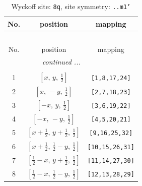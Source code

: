 \documentclass[fleqn,8pt]{jsarticle}
\begin{document}
\begin{longtable}{ccc}
\caption{Wyckoff site: {\tt 8q}, site symmetry: {\tt ..m1'}}
 \\
 \hline \hline
No. & position & mapping \\ \hline \endfirsthead

\multicolumn{2}{l}{\tablename\ \thetable{}} \\
 \hline \hline
No. & position & mapping \\ \hline \endhead

 \hline \hline
\multicolumn{2}{r}{\footnotesize\it continued ...} \\ \endfoot

 \hline \hline
\multicolumn{2}{r}{} \\ \endlastfoot

1 & $\left[ x,\, y,\, \frac{1}{2} \right]$ & {\tt [1,8,17,24]} \\ \hline
2 & $\left[ x,\, - y,\, \frac{1}{2} \right]$ & {\tt [2,7,18,23]} \\ \hline
3 & $\left[ - x,\, y,\, \frac{1}{2} \right]$ & {\tt [3,6,19,22]} \\ \hline
4 & $\left[ - x,\, - y,\, \frac{1}{2} \right]$ & {\tt [4,5,20,21]} \\ \hline
5 & $\left[ x + \frac{1}{2},\, y + \frac{1}{2},\, \frac{1}{2} \right]$ & {\tt [9,16,25,32]} \\ \hline
6 & $\left[ x + \frac{1}{2},\, \frac{1}{2} - y,\, \frac{1}{2} \right]$ & {\tt [10,15,26,31]} \\ \hline
7 & $\left[ \frac{1}{2} - x,\, y + \frac{1}{2},\, \frac{1}{2} \right]$ & {\tt [11,14,27,30]} \\ \hline
8 & $\left[ \frac{1}{2} - x,\, \frac{1}{2} - y,\, \frac{1}{2} \right]$ & {\tt [12,13,28,29]} \\
\end{longtable}
\renewcommand{\arraystretch}{1.2}
\end{document}
